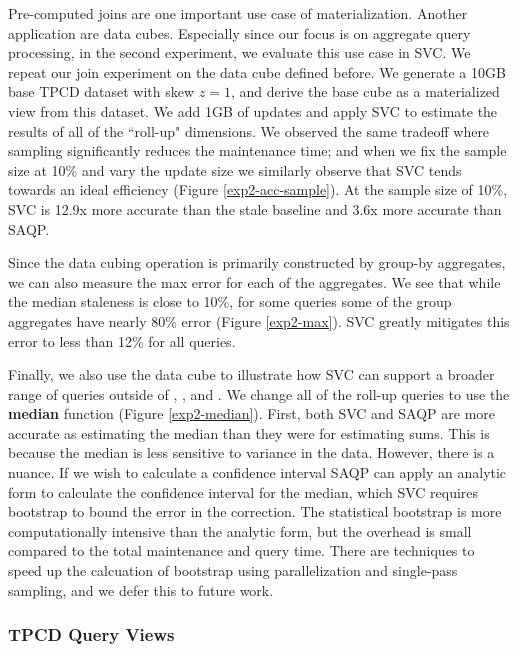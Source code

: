 Pre-computed joins are one important use case of materialization. 
Another application are data cubes.
Especially since our focus is on aggregate query processing, in the second experiment, we evaluate 
this use case in SVC.
We repeat our join experiment on the data cube defined before.
We generate a 10GB base TPCD dataset with skew $z=1$, and derive the base cube as a materialized view from this dataset.
We add 1GB of updates and apply SVC to estimate the results of all of the ``roll-up" dimensions.
We observed the same tradeoff where sampling significantly reduces the maintenance time; and when we fix the sample size at 10\%
and vary the update size we similarly observe that SVC tends towards an ideal efficiency (Figure \ref{exp2-acc-sample}).
At the sample size of 10\%, SVC is 12.9x more accurate than the stale baseline and 3.6x more accurate than SAQP.

Since the data cubing operation is primarily constructed by group-by aggregates, we can also measure the max error for each of the aggregates.
We see that while the median staleness is close to 10\%, for some queries some of the group aggregates have nearly 80\% error (Figure \ref{exp2-max}).
SVC greatly mitigates this error to less than 12\% for all queries.

Finally, we also use the data cube to illustrate how SVC can support a broader range of queries outside of \sumfunc, \countfunc, and \avgfunc.
We change all of the roll-up queries to use the \textbf{median} function (Figure \ref{exp2-median}).
First, both SVC and SAQP are more accurate as estimating the median than they were for estimating sums. 
This is because the median is less sensitive to variance in the data.
However, there is a nuance.
If we wish to calculate a confidence interval SAQP can apply an analytic form to calculate the confidence interval for the median, which SVC requires bootstrap to bound the error in the correction.
The statistical bootstrap is more computationally intensive than the analytic form, but the overhead is small compared to the total maintenance and query time.
There are techniques to speed up the calcuation of bootstrap using parallelization and single-pass sampling, and we defer this to future work.

\subsubsection{TPCD Query Views}

